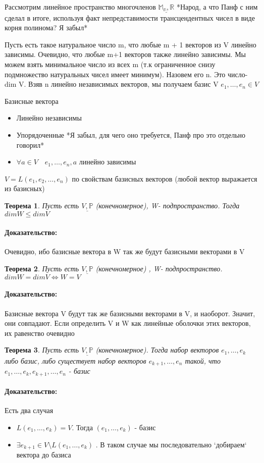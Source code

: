 \documentclass[l1pt]{article}
\newtheorem{theorem}{Теорема}
\newenvironment{proof}{\paragraph{Доказательство:}}{\hfill\newline}
\begin{document}
\begin{flushleft}
Рассмотрим линейное пространство многочленов $\underline{\mathbb{M_n}, \mathbb{R}}$ *Народ, а что Панф с ним сделал в итоге, используя факт непредставимости трансцендентных чисел в виде корня полинома? Я забыл*\newline

Пусть есть такое натуральное число m, что любые m + 1 векторов из V линейно зависимы. Очевидно, что любые m+1 векторов также линейно зависимы. Мы можем взять минимальное число из всех m (т.к ограниченное  снизу подмножество натуральных чисел имеет минимум). Назовем его n. Это число- dim V. Взяв n линейно независимых векторов, мы получаем базис V $e_1, \dots , e_n \in V$

Базисные вектора 
\begin{itemize}
 \item Линейно независимы
 \item Упорядоченные *Я забыл, для чего оно требуется, Панф про это отдельно говорил*
 \item $\forall a \in V \quad e_1, \dots , e_n, a$ линейно зависимы
\end{itemize}

$V = L(e_1, e_2, \dots, e_n)$ по свойствам базисных векторов (любой вектор выражается из базисных)



\begin{theorem}
    Пусть есть $\underline{V, \mathbb{P}}$ (конечномерное), W- подпространство. Тогда $dim W \leqslant dim V$
\end{theorem}
\begin{proof}
    Очевидно, ибо базисные вектора в W так же будут базисными векторами в V
\end{proof}

\begin{theorem}
    Пусть есть $\underline{V, \mathbb{P}}$ (конечномерное) , W- подпространство. $dim W = dim V \iff W = V$
\end{theorem}
\begin{proof}
    Базисные вектора V будут так же базисными векторами в V, и наоборот. Значит, они совпадают. Если определить V и W как линейные оболочки этих векторов, их равенство очевидно
\end{proof}

\begin{theorem}
    Пусть есть $\underline{V, \mathbb{P}}$ (конечномерное). Тогда набор векторов  $e_1, \dots , e_k$ либо базис, либо существует набор векторов $e_{k + 1}, \dots , e_n$ такой, что $e_1, \dots , e_k, e_{k+1}, \dots , e_n$ - базис
\end{theorem}
\begin{proof}
    Есть два случая 
    \begin{itemize}
        \item $L(e_1, \dots , e_k) = V$. Тогда $(e_1, \dots , e_k)$ - базис
        \item $\exists e_{k+1} \in V \setminus L(e_1, \dots , e_k)$ . В таком случае мы последовательно `добираем` вектора до базиса
\end{itemize}
\end{proof}\par


\end{flushleft}
\end{document}
